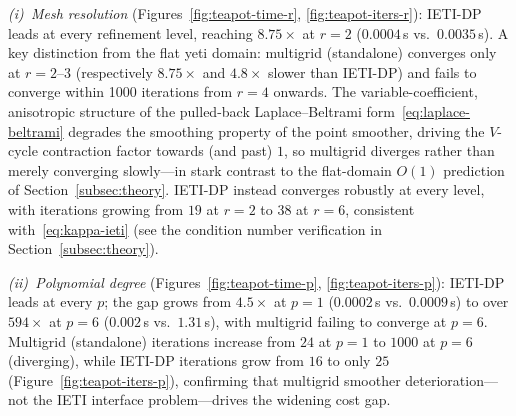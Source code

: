 \documentclass{article}
\theoremstyle{plain}
\numberwithin{equation}{section}
\begin{document}
\emph{(i)~Mesh resolution} (Figures~\ref{fig:teapot-time-r},
\ref{fig:teapot-iters-r}):
IETI-DP leads at every refinement level, reaching $8.75\times$ at $r=2$
($0.0004\,$s vs.\ $0.0035\,$s).
A key distinction from the flat yeti domain: multigrid (standalone) converges
only at $r=2$--$3$ (respectively $8.75\times$ and $4.8\times$ slower than
IETI-DP) and fails to converge within 1000 iterations from $r=4$ onwards.
The variable-coefficient, anisotropic structure of the pulled-back
Laplace--Beltrami form~\eqref{eq:laplace-beltrami} degrades the smoothing
property of the point smoother, driving the $V$-cycle contraction factor towards
(and past) $1$, so multigrid diverges rather than merely converging slowly---in
stark contrast to the flat-domain $O(1)$ prediction of
Section~\ref{subsec:theory}.
IETI-DP instead converges robustly at every level, with iterations growing from
$19$ at $r=2$ to $38$ at $r=6$, consistent with~\eqref{eq:kappa-ieti} (see the
condition number verification in Section~\ref{subsec:theory}).

\emph{(ii)~Polynomial degree} (Figures~\ref{fig:teapot-time-p},
\ref{fig:teapot-iters-p}):
IETI-DP leads at every $p$; the gap grows from $4.5\times$ at $p=1$
($0.0002\,$s vs.\ $0.0009\,$s) to over $594\times$ at $p=6$ ($0.002\,$s
vs.\ $1.31\,$s), with multigrid failing to converge at $p=6$.
Multigrid (standalone) iterations increase from $24$ at $p=1$ to $1000$ at
$p=6$ (diverging), while IETI-DP iterations grow from $16$ to only $25$
(Figure~\ref{fig:teapot-iters-p}), confirming that multigrid smoother
deterioration---not the IETI interface problem---drives the widening cost gap.
\end{document}
